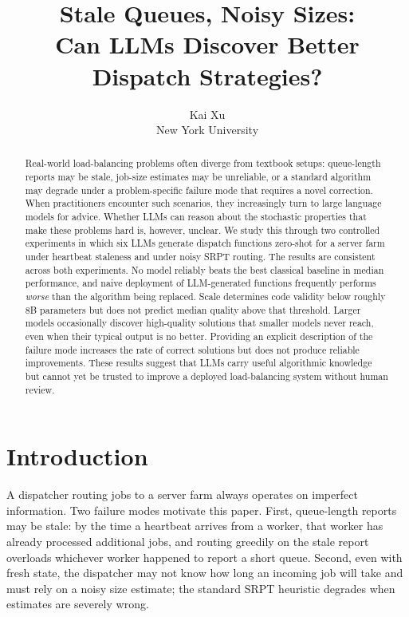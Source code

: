 \documentclass[11pt]{article}
\title{\textbf{Stale Queues, Noisy Sizes:\\
       Can LLMs Discover Better Dispatch Strategies?}}
\author{Kai Xu\\[2pt]
        \small New York University}
\date{}
\begin{document}
\maketitle

\begin{abstract}
Real-world load-balancing problems often diverge from textbook setups:
queue-length reports may be stale, job-size estimates may be
unreliable, or a standard algorithm may degrade under a
problem-specific failure mode that requires a novel correction.
When practitioners encounter such scenarios, they increasingly turn to
large language models for advice. Whether LLMs can reason about the
stochastic properties that make these problems hard is, however, unclear.
We study this through two controlled experiments in which six LLMs
generate dispatch functions zero-shot for a server farm under
heartbeat staleness and under noisy SRPT routing.
The results are consistent across both experiments.
No model reliably beats the best classical baseline in median
performance, and naive deployment of LLM-generated functions
frequently performs \emph{worse} than the algorithm being replaced.
Scale determines code validity below roughly 8B parameters but does
not predict median quality above that threshold.
Larger models occasionally discover high-quality solutions that
smaller models never reach, even when their typical output is no
better.
Providing an explicit description of the failure mode increases the
rate of correct solutions but does not produce reliable improvements.
These results suggest that LLMs carry useful algorithmic knowledge
but cannot yet be trusted to improve a deployed load-balancing
system without human review.
\end{abstract}

\section{Introduction}
\label{sec:intro}

A dispatcher routing jobs to a server farm always operates on imperfect
information.
Two failure modes motivate this paper.
First, queue-length reports may be stale: by the time a heartbeat
arrives from a worker, that worker has already processed additional
jobs, and routing greedily on the stale report overloads whichever
worker happened to report a short queue.
Second, even with fresh state, the dispatcher may not know how long
an incoming job will take and must rely on a noisy size estimate;
the standard SRPT heuristic degrades when estimates are severely
wrong.
\end{document}
